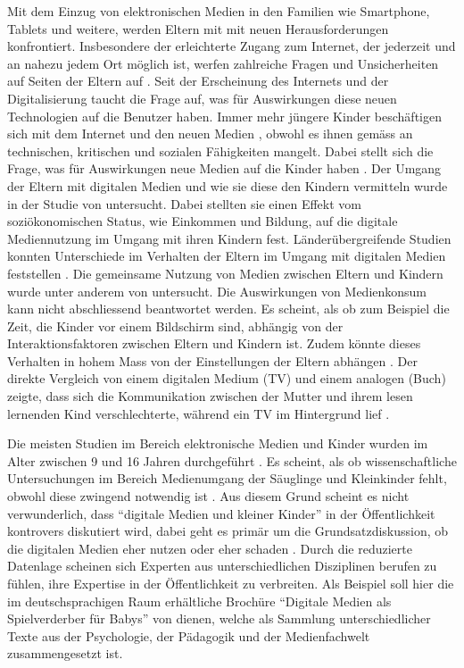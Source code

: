 Mit dem Einzug von elektronischen Medien in den Familien wie Smartphone, Tablets und weitere, werden Eltern mit mit neuen Herausforderungen konfrontiert. Insbesondere der erleichterte Zugang zum Internet, der jederzeit und an nahezu jedem Ort möglich ist, werfen zahlreiche Fragen und Unsicherheiten auf Seiten der Eltern auf \cite{Wagner2016}. Seit der Erscheinung des Internets und der Digitalisierung taucht die Frage auf, was für Auswirkungen diese neuen Technologien auf die Benutzer haben. Immer mehr jüngere Kinder beschäftigen sich mit dem Internet und den neuen Medien \cite{Rideout2013a, Chaudron2015}, obwohl es ihnen gemäss  an technischen, kritischen und sozialen Fähigkeiten mangelt. Dabei stellt sich die Frage, was für Auswirkungen neue Medien auf die Kinder haben \cite{Tomopoulos2010, Pempek2014, Livingstone2015, Masur2015, Troseth2016}. Der Umgang der Eltern mit digitalen Medien und wie sie diese den Kindern vermitteln wurde in der Studie von  untersucht. Dabei stellten sie einen Effekt vom soziökonomischen Status, wie Einkommen und Bildung, auf die digitale Mediennutzung im Umgang mit ihren Kindern fest. Länderübergreifende Studien konnten Unterschiede im Verhalten der Eltern im Umgang mit digitalen Medien feststellen \cite{Helsper2013}. Die gemeinsame Nutzung von Medien zwischen Eltern und Kindern wurde unter anderem von  untersucht. Die Auswirkungen von Medienkonsum kann nicht abschliessend beantwortet werden. Es scheint, als ob zum Beispiel die Zeit, die Kinder vor einem Bildschirm sind, abhängig von der Interaktionsfaktoren zwischen Eltern und Kindern ist. Zudem könnte dieses Verhalten in hohem Mass von der Einstellungen der Eltern abhängen \cite{Lauricella2015}. Der direkte Vergleich von einem digitalen Medium (TV) und einem analogen (Buch) zeigte, dass sich die Kommunikation zwischen der Mutter und ihrem lesen lernenden Kind verschlechterte, während ein TV im Hintergrund lief \cite{Nathanson2011}.

Die meisten Studien im Bereich elektronische Medien und Kinder wurden im Alter zwischen 9 und 16 Jahren durchgeführt \cite{Chaudron2015}. Es scheint, als ob wissenschaftliche Untersuchungen im Bereich Medienumgang der Säuglinge und Kleinkinder fehlt, obwohl diese zwingend notwendig ist \cite{Olafsson2014, Konitzer2017}. Aus diesem Grund scheint es nicht verwunderlich, dass \enquote{digitale Medien und kleiner Kinder} in der Öffentlichkeit kontrovers diskutiert wird, dabei geht es primär um die Grundsatzdiskussion, ob die digitalen Medien eher nutzen oder eher schaden \cite{Divsi2015}. Durch die reduzierte Datenlage scheinen sich Experten aus unterschiedlichen Disziplinen berufen zu fühlen, ihre Expertise in der Öffentlichkeit zu verbreiten. Als Beispiel soll hier die im deutschsprachigen Raum erhältliche Brochüre \enquote{Digitale Medien als Spielverderber für Babys} von  dienen, welche als Sammlung unterschiedlicher Texte aus der Psychologie, der Pädagogik und der Medienfachwelt zusammengesetzt ist. 

